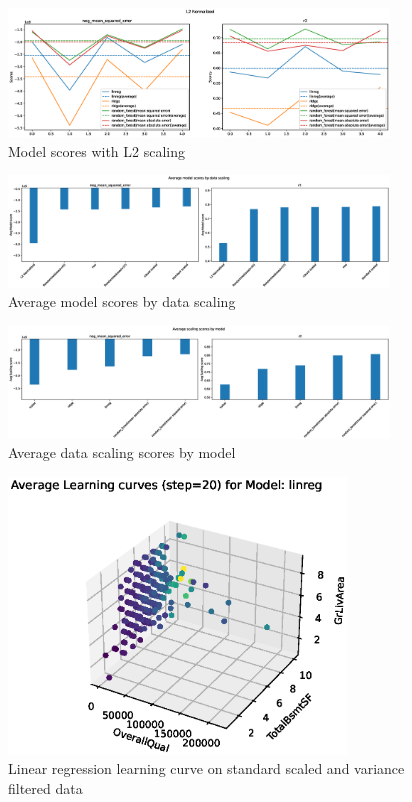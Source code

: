 \documentclass[a4paper,12pt]{article}
\begin{document}
\begin{figure}[h]
\centering
\includegraphics[width=0.9\textwidth]{plots/L2_Normalized_model_scores}
\caption{Model scores with L2 scaling}
\end{figure}

\begin{figure}[h]
\centering
\includegraphics[width=0.9\textwidth]{plots/Average_model_scores_by_data_scaling_barcharts}
\caption{Average model scores by data scaling}
\end{figure}

\begin{figure}[h]
\centering
\includegraphics[width=0.9\textwidth]{plots/Average_scaling_scores_by_model_barcharts}
\caption{Average data scaling scores by model}
\end{figure}

\begin{figure}[h]
\centering
\includegraphics[width=0.8\textwidth]{plots/linreg_learning_curves}
\caption{Linear regression learning curve on standard scaled and variance filtered data}
\end{figure}
\end{document}
